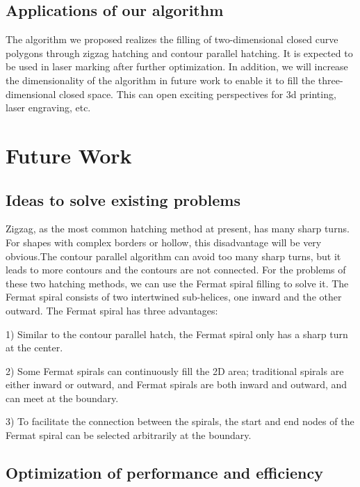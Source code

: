 \documentclass{apmcmthesis}
\begin{document}
\subsection{Applications of our algorithm}

The algorithm we proposed realizes the filling of two-dimensional closed curve polygons through zigzag hatching and contour parallel hatching. It is expected to be used in laser marking after further optimization. In addition, we will increase the dimensionality of the algorithm in future work to enable it to fill the three-dimensional closed space. This can open exciting perspectives for 3d printing, laser engraving, etc.

\section{Future Work}
\subsection{Ideas to solve existing problems}
Zigzag, as the most common hatching method at present, has many sharp turns. For shapes with complex borders or hollow, this disadvantage will be very obvious.The contour parallel algorithm can avoid too many sharp turns, but it leads to more contours and the contours are not connected. For the problems of these two hatching methods, we can use the Fermat spiral filling to solve it. The Fermat spiral consists of two intertwined sub-helices, one inward and the other outward. The Fermat spiral has three advantages:
\cite{2}


1) Similar to the contour parallel hatch, the Fermat spiral only has a sharp turn at the center.


2) Some Fermat spirals can continuously fill the 2D area; traditional spirals are either inward or outward, and Fermat spirals are both inward and outward, and can meet at the boundary.


3) To facilitate the connection between the spirals, the start and end nodes of the Fermat spiral can be selected arbitrarily at the boundary.
\subsection{Optimization of performance and efficiency}
\end{document}
